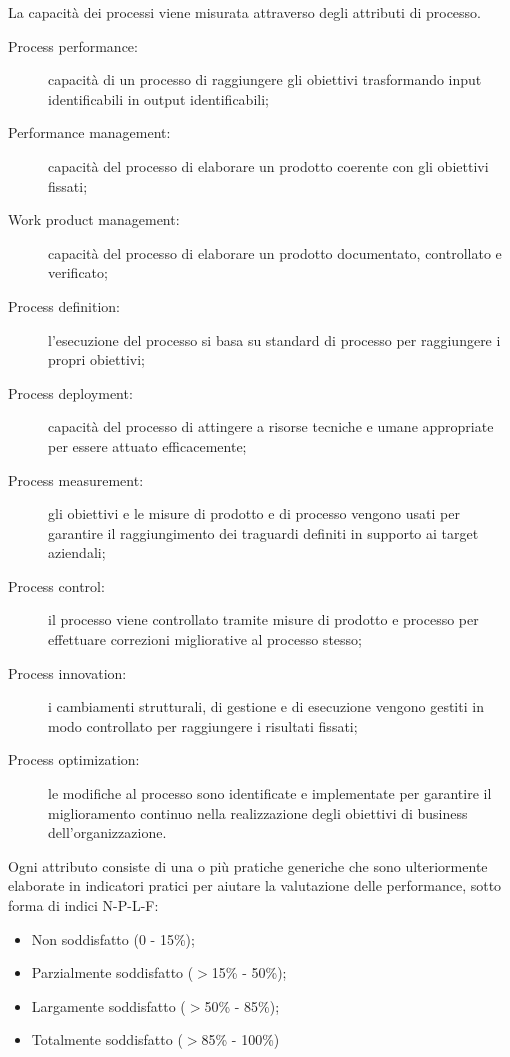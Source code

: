 \documentclass[PianoDiQualifica.tex]{subfiles}
\begin{document}
\begin{appendices}
La capacità dei processi viene misurata attraverso degli attributi di processo.
\begin{description}
\item [Process performance:] capacità di un processo di raggiungere gli obiettivi trasformando input identificabili in output identificabili;
\item [Performance management:] capacità del processo di elaborare un prodotto coerente con gli obiettivi fissati;
\item [Work product management:] capacità del processo di elaborare un prodotto documentato, controllato e verificato;
\item [Process definition:] l'esecuzione del processo si basa su standard di processo per raggiungere i propri obiettivi;
\item [Process deployment:] capacità del processo di attingere a risorse tecniche e umane appropriate per essere attuato efficacemente;
\item [Process measurement:] gli obiettivi e le misure di prodotto e di processo vengono usati per garantire il raggiungimento dei traguardi definiti in supporto ai target aziendali;
\item [Process control:] il processo viene controllato tramite misure di prodotto e processo per effettuare correzioni migliorative al processo stesso;
\item [Process innovation:] i cambiamenti strutturali, di gestione e di esecuzione vengono gestiti in modo controllato per raggiungere i risultati fissati;
\item [Process optimization:] le modifiche al processo sono identificate e implementate per garantire il miglioramento continuo nella realizzazione degli obiettivi di business dell'organizzazione. 
\end{description}

Ogni attributo consiste di una o più pratiche generiche che sono ulteriormente elaborate in indicatori pratici per aiutare la valutazione delle performance, sotto forma di indici N-P-L-F:
\begin{itemize}
	\item Non soddisfatto (0 - 15\%);
	\item Parzialmente soddisfatto ($ > $15\% - 50\%);
	\item Largamente soddisfatto ($ > $50\% - 85\%);
	\item Totalmente soddisfatto ($ > $85\% - 100\%)
\end{itemize}

\end{appendices}
\end{document}
